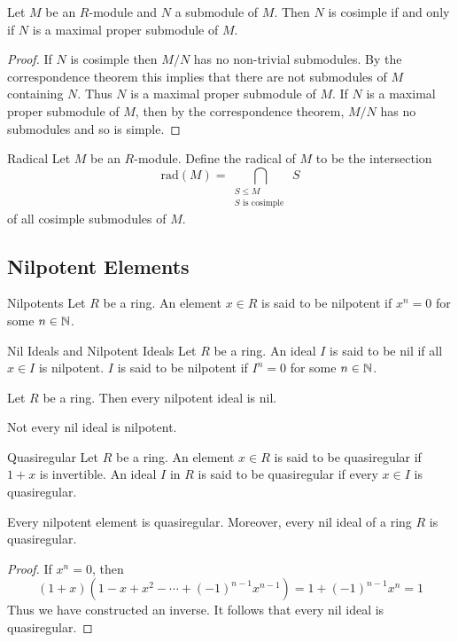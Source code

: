 \documentclass[a4paper]{article}
\begin{document}
\begin{lmm}{}{} Let $M$ be an $R$-module and $N$ a submodule of $M$. Then $N$ is cosimple if and only if $N$ is a maximal proper submodule of $M$. \tcbline
\begin{proof}
If $N$ is cosimple then $M/N$ has no non-trivial submodules. By the correspondence theorem this implies that there are not submodules of $M$ containing $N$. Thus $N$ is a maximal proper submodule of $M$. If $N$ is a maximal proper submodule of $M$, then by the correspondence theorem, $M/N$ has no submodules and so is simple. 
\end{proof}
\end{lmm}

\begin{defn}{Radical}{} Let $M$ be an $R$-module. Define the radical of $M$ to be the intersection $$\text{rad}(M)=\bigcap_{\substack{S\leq M\\S\text{ is cosimple }}}S$$ of all cosimple submodules of $M$. 
\end{defn}

\subsection{Nilpotent Elements}
\begin{defn}{Nilpotents}{} Let $R$ be a ring. An element $x\in R$ is said to be nilpotent if $x^n=0$ for some $n\in\mathbb{N}$. 
\end{defn}

\begin{defn}{Nil Ideals and Nilpotent Ideals}{} Let $R$ be a ring. An ideal $I$ is said to be nil if all $x\in I$ is nilpotent. $I$ is said to be nilpotent if $I^n=0$ for some $n\in\mathbb{N}$. 
\end{defn}

\begin{lmm}{}{} Let $R$ be a ring. Then every nilpotent ideal is nil. 
\end{lmm}

Not every nil ideal is nilpotent. 

\begin{defn}{Quasiregular}{} Let $R$ be a ring. An element $x\in R$ is said to be quasiregular if $1+x$ is invertible. An ideal $I$ in $R$ is said to be quasiregular if every $x\in I$ is quasiregular. 
\end{defn}

\begin{lmm}{}{} Every nilpotent element is quasiregular. Moreover, every nil ideal of a ring $R$ is quasiregular. \tcbline
\begin{proof}
If $x^n=0$, then $$(1+x)(1-x+x^2-\cdots+(-1)^{n-1}x^{n-1})=1+(-1)^{n-1}x^n=1$$ Thus we have constructed an inverse. It follows that every nil ideal is quasiregular. 
\end{proof}
\end{lmm}
\end{document}
